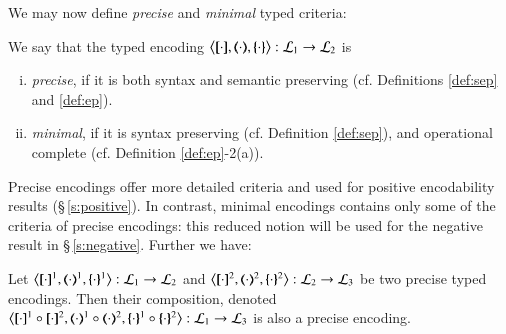 We may now define \emph{precise} and \emph{minimal} typed criteria: 

\begin{definition}\rm\label{def:goodenc}
We say that 
	the typed encoding 
	$\enco{\map{\cdot}, \mapt{\cdot}, \mapa{\cdot}}: \tyl{L}_1 \to \tyl{L}_2$ is 
	\begin{enumerate}[(i)]
	\item \emph{precise}, if it is both syntax and semantic preserving (cf. Definitions \ref{def:sep} and  \ref{def:ep}).
	\item \emph{minimal}, if it is syntax preserving 
	(cf. Definition \ref{def:sep}),
	and operational complete (cf. Definition \ref{def:ep}-2(a)).
	\end{enumerate}
\end{definition}

Precise encodings offer more detailed criteria and used for positive 
encodability results (\S\,\ref{s:positive}).
In contrast, minimal encodings contains only 
some of the criteria of precise encodings:    
this reduced notion will be used 
for the negative result in \S\,\ref{s:negative}. Further we have:
	



\begin{proposition}\rm
	\label{prop:enc_composability}
	Let %
	$\enco{\map{\cdot}^{1}, \mapt{\cdot}^{1}, \mapa{\cdot}^{1}}: \tyl{L}_1 \to \tyl{L}_2$
	and 
	$\enco{\map{\cdot}^{2}, \mapt{\cdot}^{2}, \mapa{\cdot}^{2}}: \tyl{L}_2 \to \tyl{L}_3$
	be two precise typed encodings.
	Then their composition, denoted 
	$\enco{\map{\cdot}^{1} \circ \map{\cdot}^{2}, \mapt{\cdot}^{1} \circ \mapt{\cdot}^{2}, \mapa{\cdot}^{1}\circ \mapa{\cdot}^{2}}: \tyl{L}_1 \to \tyl{L}_3$
	is also a precise encoding.
\end{proposition}

